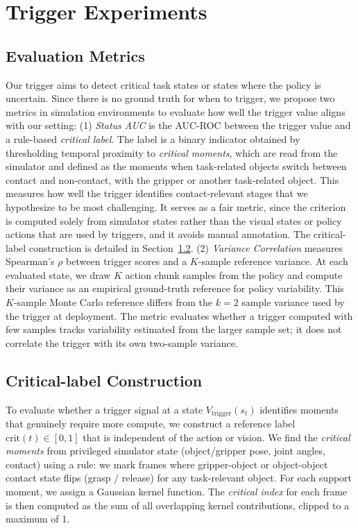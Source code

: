 \documentclass[10pt,twocolumn,letterpaper]{article}
\begin{document}
\section{Trigger Experiments}
\label{exp:trigger_exp}


\subsection{Evaluation Metrics}
\label{exp:trigger_metric}
Our trigger aims to detect critical task states or states where the policy is uncertain. Since there is no ground truth for when to trigger, we propose two metrics in simulation environments to evaluate how well the trigger value aligns with our setting: (1) \textit{Status AUC} is the AUC-ROC between the trigger value and a rule-based \textit{critical label}. The label is a binary indicator obtained by thresholding temporal proximity to \textit{critical moments}, which are read from the simulator and defined as the moments when task-related objects switch between contact and non-contact, with the gripper or another task-related object. This measures how well the trigger identifies contact-relevant stages that we hypothesize to be most challenging. It serves as a fair metric, since the criterion is computed solely from simulator states rather than the visual states or policy actions that are used by triggers, and it avoids manual annotation. The critical-label construction is detailed in Section~\ref{appendix:status_AUC}.
(2) \textit{Variance Correlation} measures Spearman's $\rho$ between trigger scores and a $K$-sample reference variance. At each evaluated state, we draw $K$ action chunk samples from the policy and compute their variance as an empirical ground-truth reference for policy variability. This $K$-sample Monte Carlo reference differs from the $k=2$ sample variance used by the trigger at deployment. The metric evaluates whether a trigger computed with few samples tracks variability estimated from the larger sample set; it does not correlate the trigger with its own two-sample variance.

\subsection{Critical-label Construction}
\label{appendix:status_AUC}

To evaluate whether a trigger signal at a state $V_\text{trigger}(s_t)$ identifies moments
that genuinely require more compute, we construct a reference label
$\text{crit}(t) \in [0, 1]$ that is independent of the action or vision. We find the \textit{critical moments}
from privileged simulator state (object/gripper pose, joint angles, contact) using a rule: we mark frames where gripper-object or object-object contact state flips (grasp / release) for any task-relevant object. For each support moment, we assign a Gaussian kernel function. The \textit{critical index} for each frame is then computed as the sum of all overlapping kernel contributions, clipped to a maximum of 1.
\end{document}
